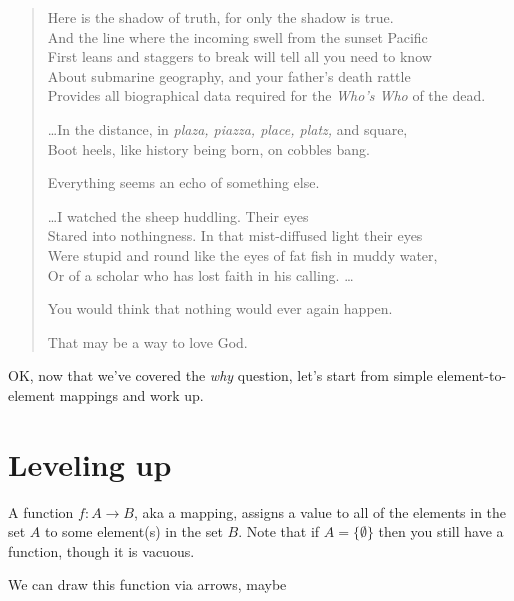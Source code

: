 \documentclass[11pt]{article}
\begin{document}
\begin{verse}
Here is the shadow of truth, for only the shadow is true.\\
And the line where the incoming swell from the sunset Pacific\\
First leans and staggers to break will tell all you need to know\\
About submarine geography, and your father's death rattle\\
Provides all biographical data required for the {\em Who's Who} of the dead.

\dots In the distance, in {\em plaza, piazza, place, platz,} and square,\\
Boot heels, like history being born, on cobbles bang.

Everything seems an echo of something else.

\dots I watched the sheep huddling.  Their eyes\\
Stared into nothingness.  In that mist-diffused light their eyes\\
Were stupid and round like the eyes of fat fish in muddy water,\\
Or of a scholar who has lost faith in his calling. \dots

You would think that nothing would ever again happen.

That may be a way to love God.
\end{verse}

OK, now that we've covered the {\em why} question, let's start from simple element-to-element
mappings and work up.

\section{Leveling up}\label{levelsec}

A function $f:A\to B$, aka a mapping, assigns a value to all of the elements in the set $A$ to
some element(s) in the set $B$. Note that if $A=\{\emptyset\}$ then you still have a function, though
it is vacuous.

We can draw this function via arrows, maybe

\begin{center}
\end{center}
\end{document}
